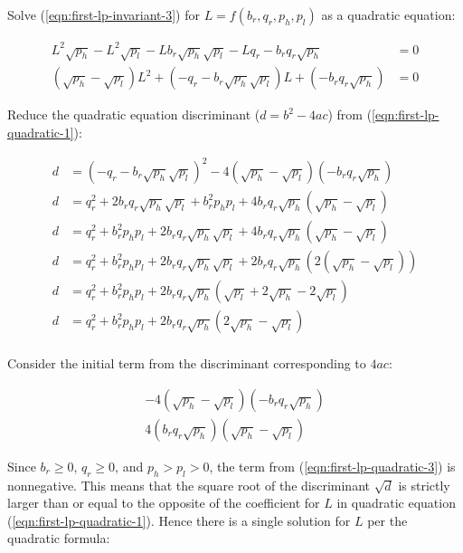 \documentclass[table, twocolumn]{article}
\begin{document}
Solve (\ref{eqn:first-lp-invariant-3}) for $L = f(b_r, q_r, p_h, p_l)$ as a quadratic
equation:

\begin{align} \label{eqn:first-lp-quadratic-1}
  L^2 \sqrt{p_h} - L^2 \sqrt{p_l} - L b_r \sqrt{p_h} \sqrt{p_l} - L q_r
  - b_r q_r \sqrt{p_h}  & = 0 \nonumber \\
  (\sqrt{p_h} - \sqrt{p_l}) L^2 + (-q_r -b_r \sqrt{p_h} \sqrt{p_l}) L +
  (-b_r q_r \sqrt{p_h}) & = 0
\end{align}

Reduce the quadratic equation discriminant ($d = b^2 - 4ac$) from
(\ref{eqn:first-lp-quadratic-1}):

\begin{align} \label{eqn:first-lp-quadratic-2}
  d & = (-q_r - b_r \sqrt{p_h} \sqrt{p_l})^2
  - 4(\sqrt{p_h} - \sqrt{p_l})(-b_r q_r \sqrt{p_h}) \nonumber    \\
  d & = q_r^2 + 2 b_r q_r \sqrt{p_h} \sqrt{p_l} + b_r^2 p_h p_l
  + 4 b_r q_r \sqrt{p_h} (\sqrt{p_h} - \sqrt{p_l}) \nonumber     \\
  d & = q_r^2 + b_r^2 p_h p_l + 2 b_r q_r \sqrt{p_h} \sqrt{p_l}
  + 4 b_r q_r \sqrt{p_h} (\sqrt{p_h} - \sqrt{p_l}) \nonumber     \\
  d & = q_r^2 + b_r^2 p_h p_l + 2 b_r q_r \sqrt{p_h} \sqrt{p_l}
  + 2 b_r q_r \sqrt{p_h} (2 (\sqrt{p_h} - \sqrt{p_l})) \nonumber \\
  d & = q_r^2 + b_r^2 p_h p_l + 2 b_r q_r \sqrt{p_h}
  (\sqrt{p_l} + 2 \sqrt{p_h} - 2 \sqrt{p_l}) \nonumber           \\
  d & = q_r^2 + b_r^2 p_h p_l + 2 b_r q_r \sqrt{p_h}
  (2 \sqrt{p_h} - \sqrt{p_l}) \nonumber                          \\
\end{align}

Consider the initial term from the discriminant corresponding to $4ac$:

\begin{align} \label{eqn:first-lp-quadratic-3}
  - 4(\sqrt{p_h} - \sqrt{p_l})(-b_r q_r \sqrt{p_h}) \nonumber \\
  4(b_r q_r \sqrt{p_h})(\sqrt{p_h} - \sqrt{p_l})
\end{align}

Since $b_r \geq 0$, $q_r \geq 0$, and $p_h > p_l > 0$, the term from
(\ref{eqn:first-lp-quadratic-3}) is nonnegative. This means that the square root of the
discriminant $\sqrt{d}$ is strictly larger than or equal to the opposite of the
coefficient for $L$ in quadratic equation (\ref{eqn:first-lp-quadratic-1}). Hence there
is a single solution for $L$ per the quadratic formula:
\end{document}
